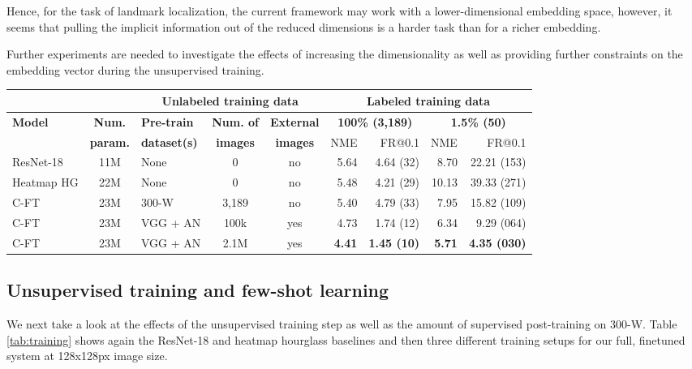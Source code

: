 \documentclass[10pt,twocolumn,letterpaper]{article}
\begin{document}
Hence, for the task of landmark localization, the current framework may work with a lower-dimensional embedding space, however, it seems that pulling the implicit information out of the reduced dimensions is a harder task than for a richer embedding.

Further experiments are needed to investigate the effects of increasing the dimensionality as well as providing further constraints on the embedding vector  during the unsupervised training.

\begin{table*}
\begin{center}
		\begin{tabular}{lclcc|rr|rr}
			\toprule
			& & \multicolumn{3}{c}{\bfseries Unlabeled training data}  &  \multicolumn{4}{c}{\bfseries Labeled training data} \\
			\toprule
			\bf Model & \bf Num. & \bf Pre-train & \bf Num. of & \bf External  & \multicolumn{2}{c}{\bfseries 100\% (3,189)} & \multicolumn{2}{c}{\bfseries 1.5\% (50)} \\
			& \bf param. & \bf dataset(s) & \bf images & \bf images & NME & FR@0.1 &  NME &  FR@0.1 \\
			\toprule
			ResNet-18 & 11M & None & 0 & no & 5.64 & 4.64 (32) & 8.70 & 22.21 (153)  \\
			Heatmap HG & 22M & None & 0 & no & 5.48 & 4.21 (29) & 10.13 & 39.33 (271)  \\
\midrule
			C-FT & 23M & 300-W & 3,189 & no & 5.40 & 4.79 (33) & 7.95& 15.82 (109)\\
			\midrule
			C-FT & 23M & VGG + AN & 100k & yes & 4.73 & 1.74 (12) & 6.34 & 9.29 (064) \\
			C-FT & 23M & VGG + AN & 2.1M & yes & \bf 4.41 & \bf 1.45 (10) & \bf 5.71 & \bf 4.35 (030) \\
			\bottomrule
		\end{tabular}	
	\end{center}
	\vspace{-0.4cm}
	\caption{Effect of unsupervised pre-training when trained with full and reduced labeled training data on 300-W.}	
	\label{tab:training}
\end{table*}

\subsection{Unsupervised training and few-shot learning}\label{training}

We next take a look at the effects of the unsupervised training step as well as the amount of supervised post-training on 300-W. Table \ref{tab:training} shows again the ResNet-18 and heatmap hourglass baselines and then three different training setups for our full, finetuned system at 128x128px image size. 
\end{document}
